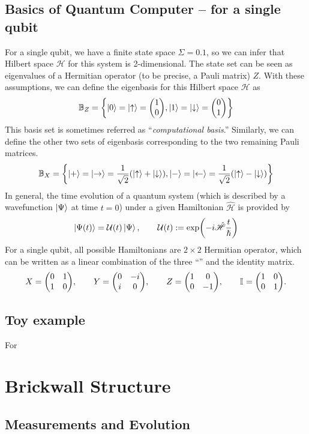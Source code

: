 \documentclass[11pt, oneside]{scrbook}
\renewcommand{\H}{\mathcal{H}}
\renewcommand{\HH}{\hat{\mathscr{H}}}
\newcommand{\ku}{\ket{\uparrow}}
\newcommand{\kd}{\ket{\downarrow}}
\newcommand{\kr}{\ket{\rightarrow}}
\newcommand{\kl}{\ket{\leftarrow}}
\newcommand{\UU}{\mathcal{U}}
\begin{document}
\subsection{Basics of Quantum Computer -- for a single qubit}
For a single qubit, we have a finite state space \(\Sigma = \qty{0, 1}\), so we can infer that Hilbert space \(\H\) for this system is 2-dimensional. The state set can be seen as eigenvalues of a Hermitian operator (to be precise, a Pauli matrix) \(Z\). With these assumptions, we can define the eigenbasis for this Hilbert space \(\H\) as
\[
    \B_Z = \qty{\ket{0} = \ku = \mqty(1 \\ 0), \ket{1}= \kd = \mqty(0 \\ 1)}
\]
This basis set is sometimes referred as ``\emph{computational basis}.'' Similarly, we can define the other two sets of eigenbasis corresponding to the two remaining Pauli matrices.
\begin{equation}
    \B_X = \qty{\ket{+} = \kr = \frac{1}{\sqrt{2}} \qty(\ku + \kd), \ket{-} = \kl = \frac{1}{\sqrt{2}} \qty(\ku - \kd)}
\end{equation}
In general, the time evolution of a quantum system (which is described by a wavefunction \(\ket{\Psi}\) at time \(t = 0\)) under a given Hamiltonian \(\hat{\mathscr{H}}\) is provided by
\[
    \ket{\Psi (t)} = \UU(t) \ket{\Psi}, \qquad \UU(t) := \exp(- i \HH \frac{t}{\hslash})
\]
For a single qubit, all possible Hamiltonians are \(2 \times 2\) Hermitian operator, which can be written as a linear combination of the three ``'' and the identity matrix.
\begin{equation}
    X = \mqty(0 & 1 \\ 1 & 0), \qquad Y = \mqty(0 & -i \\ i & 0), \qquad Z = \mqty(1 & 0 \\ 0 & -1), \qquad \I{} = \mqty(1 & 0 \\ 0 & 1).
\end{equation}

\subsection{Toy example}

For

\section{Brickwall Structure}

\subsection{Measurements and Evolution}
\end{document}
